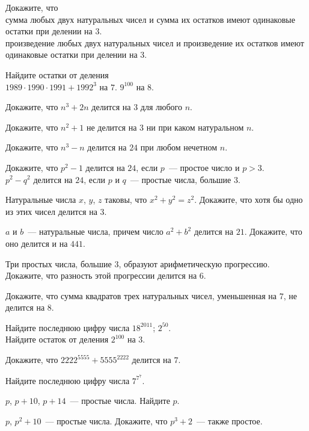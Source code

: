 %
%

\begin{problems}

\item
Докажите, что
\\\sbp
сумма любых двух натуральных чисел и сумма их остатков имеют одинаковые остатки
при делении на 3.
\\\sbp
произведение любых двух натуральных чисел и произведение их остатков имеют
одинаковые остатки при делении на 3.

\item
Найдите остатки от деления
\\
\sbp $1989 \cdot 1990 \cdot 1991 + 1992^3$ на $7$.
\quad
\sbp $9^{100}$ на $8$.

\item
Докажите, что $n^3 + 2 n$ делится на $3$ для любого $n$.

\item
Докажите, что $n^2 + 1$ не делится на $3$ ни при каком натуральном $n$.

\item
Докажите, что $n^3 - n$ делится на $24$ при любом нечетном $n$.

\item
Докажите, что
\quad
\sbp
$p^2 - 1$ делится на $24$, если $p$~--- простое число и $p > 3$.
\\
\sbp
$p^2 - q^2$ делится на $24$, если $p$ и $q$~--- простые числа, большие $3$.

\item
Натуральные числа $x$, $y$, $z$ таковы, что $x^2 + y^2 = z^2$.
Докажите, что хотя бы одно из этих чисел делится на $3$.

\item
$a$ и $b$~--- натуральные числа, причем число $a^2 + b^2$ делится на $21$.
Докажите, что оно делится и на $441$.

\item
Три простых числа, большие $3$, образуют арифметическую прогрессию.
Докажите, что разность этой прогрессии делится на $6$.

\item
Докажите, что сумма квадратов трех натуральных чисел, уменьшенная на $7$, не
делится на $8$.

\item
Найдите последнюю цифру числа
\quad
\sbp $18^{2011}$;
\quad
\sbp $2^{50}$.
\\\sbp
Найдите остаток от деления $2^{100}$ на $3$.

\item
Докажите, что $2222^{5555} + 5555^{2222}$ делится на $7$.

\item
Найдите последнюю цифру числа $7^{7^{7}}$.

\item
$p$, $p + 10$, $p + 14$~--- простые числа.
Найдите $p$.

\item
$p$, $p^2 + 10$~--- простые числа.
Докажите, что $p^3 + 2$~--- также простое.

\end{problems}

